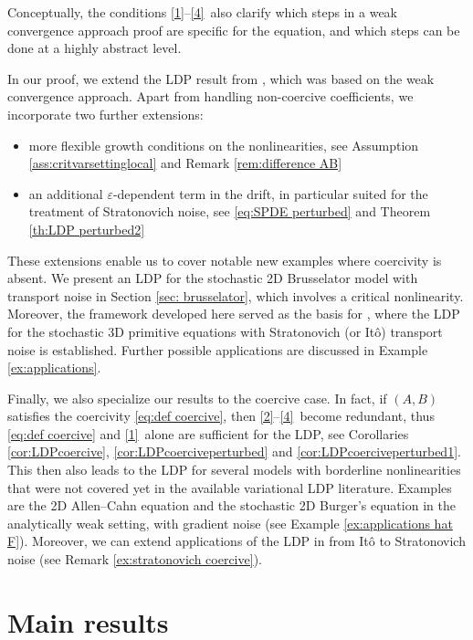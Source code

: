 \documentclass{amsart}
\newcommand{\<}{\langle}
\newcommand{\?}{\rangle}
\theoremstyle{plain}
\theoremstyle{remark}
\theoremstyle{plain}
\numberwithin{equation}{section}
\newcommand{\eps}{\varepsilon}
\begin{document}
Conceptually, the conditions \ref{1}--\ref{4}\ also  clarify  which steps in a weak convergence approach proof are specific for the equation, and which steps can be done at a highly abstract level. 
 

In our proof, we extend the LDP result from \cite{TV24}, which was based on the weak convergence approach. Apart from handling non-coercive coefficients,  we incorporate two further extensions:  
\begin{itemize} 
  \item  more flexible growth conditions on the nonlinearities, see Assumption \ref{ass:critvarsettinglocal} and Remark \ref{rem:difference AB}    
  \item an additional $\eps$-dependent term in the drift, in particular suited for the treatment of Stratonovich noise, see \eqref{eq:SPDE perturbed} and  Theorem \ref{th:LDP perturbed2}  
\end{itemize}

These extensions enable us to cover notable new examples where coercivity is absent.  
We present an LDP for the stochastic 2D Brusselator model with transport noise in Section \ref{sec: brusselator}, which involves a critical nonlinearity. Moreover, the framework developed here served as the basis for \cite{AT25}, where the LDP for the stochastic 3D primitive equations with Stratonovich (or It\^o) transport noise is established. Further possible  applications are discussed in Example \ref{ex:applications}.  

Finally, we also specialize our results to the coercive case. In fact, if $(A,B)$ satisfies the coercivity \eqref{eq:def coercive}, then \ref{2}--\ref{4}\ become redundant, thus \eqref{eq:def coercive} and \ref{1}\ alone are sufficient for the LDP, see Corollaries  \ref{cor:LDPcoercive}, \ref{cor:LDPcoerciveperturbed} and \ref{cor:LDPcoerciveperturbed1}. This then also leads to the LDP for several models with borderline nonlinearities that were not covered yet in the available variational LDP literature. Examples are the 2D Allen--Cahn equation  and the stochastic 2D Burger's equation in the analytically weak setting, with gradient noise (see Example \ref{ex:applications hat F}). Moreover, we can extend applications of the LDP in \cite{TV24} from It\^o to Stratonovich noise (see Remark \ref{ex:stratonovich coercive}). 

 

 
\section{Main results}\label{sec:main results} 
\end{document}
